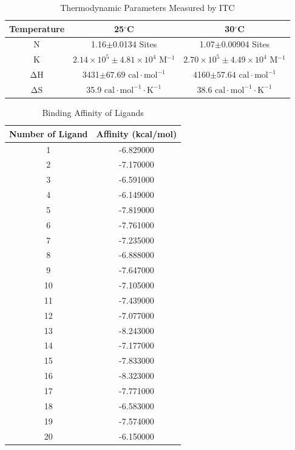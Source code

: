 \documentclass{report}
\begin{document}
 \begin{table}
    \centering
    \caption{Thermodynamic Parameters Measured by ITC}
    \begin{tabular}{|c|c|c|}
        \toprule
        Temperature & 25$^\circ$C & 30$^\circ$C \\
        \midrule
        N & 1.16$\pm$0.0134 Sites & 1.07$\pm$0.00904 Sites \\
        K & $2.14\times 10^5\pm4.81\times10^4$ M$^{-1}$ & $2.70\times 10^5\pm4.49\times10^4$ M$^{-1}$ \\
        ΔH &3431$\pm67.69$ $\text{cal}\cdot\text{mol}^{-1}$ & 4160$\pm57.64$ $\text{cal}\cdot\text{mol}^{-1}$ \\
        ΔS &  35.9 $\text{cal}\cdot\text{mol}^{-1}\cdot\text{K}^{-1}$  & 38.6 $\text{cal}\cdot\text{mol}^{-1}\cdot\text{K}^{-1}$  \\
        \bottomrule
    \end{tabular}
    \label{Thermodynamic Parameters Measured by ITC}
 \end{table}

\begin{table}
    \caption{Binding Affinity of Ligands}
    \label{Binding Affinity of 20 Ligands}
    \centering
    \begin{tabular}{|c|c|}
        \toprule
        Number of Ligand & Affinity (kcal/mol) \\
        \midrule
        1 & -6.829000 \\
        2 & -7.170000 \\
        3 & -6.591000 \\
        4 & -6.149000 \\
        5 & -7.819000 \\
        6 & -7.761000 \\
        7 & -7.235000 \\
        8 & -6.888000 \\
        9 & -7.647000 \\
        10 & -7.105000 \\
        11 & -7.439000 \\
        12 & -7.077000 \\
        13 & -8.243000 \\
        14 & -7.177000 \\
        15 & -7.833000 \\
        16 & -8.323000 \\
        17 & -7.771000 \\
        18 & -6.583000 \\
        19 & -7.574000 \\
        20 & -6.150000 \\
        \bottomrule
        \end{tabular}        
      
\end{table}
\end{document}
